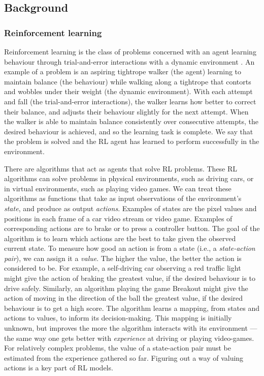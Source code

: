 \documentclass[12pt,a4paper]{article}
\begin{document}
\subsection{Background} 
\subsubsection{Reinforcement learning}
Reinforcement learning is the class of problems concerned with an agent learning behaviour through trial-and-error interactions with a dynamic environment \cite{Kaelbling1996}. An example of a problem is an aspiring tightrope walker (the agent) learning to maintain balance (the behaviour) while walking along a tightrope that contorts and wobbles under their weight (the dynamic environment). With each attempt and fall (the trial-and-error interactions), the walker learns how better to correct their balance, and adjusts their behaviour slightly for the next attempt. When the walker is able to maintain balance consistently over consecutive attempts, the desired behaviour is achieved, and so the learning task is complete. We say that the problem is solved and the RL agent has learned to perform successfully in the environment.  

There are algorithms that act as agents that solve RL problems. These RL algorithms can solve problems in physical environments, such as driving cars, or in virtual environments, such as playing video games. We can treat these algorithms as functions that take as input observations of the environment's \emph{state}, and produce as output \emph{actions}. Examples of states are the pixel values and positions in each frame of a car video stream or video game. Examples of corresponding actions are to brake or to press a controller button. The goal of the algorithm is to learn which actions are the best to take given the observed current state. To measure how good an action is from a state (i.e., a \emph{state-action pair}), we can assign it a \emph{value}. The higher the value, the better the action is considered to be. For example, a self-driving car observing a red traffic light might give the action of braking the greatest value, if the desired behaviour is to drive safely. Similarly, an algorithm playing the game Breakout might give the action of moving in the direction of the ball the greatest value, if the desired behaviour is to get a high score. The algorithm learns a mapping, from states and actions to values, to inform its decision-making. This mapping is initially unknown, but improves the more the algorithm interacts with its environment --- the same way one gets better with \emph{experience} at driving or playing video-games. For relatively complex problems, the value of a state-action pair must be estimated from the experience gathered so far. Figuring out a way of valuing actions is a key part of RL models.
\end{document}
